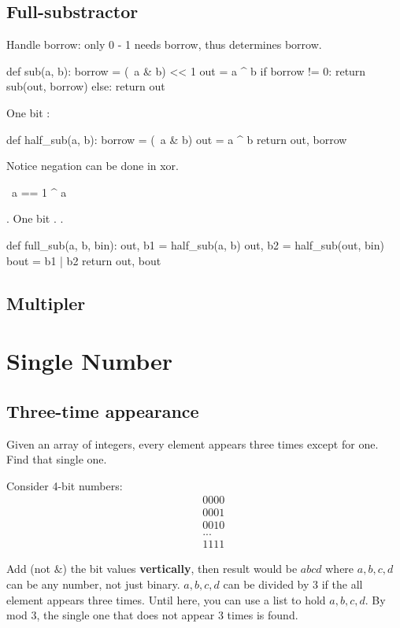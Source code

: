 \subsection{Full-substractor}
 Handle borrow: only 0 - 1 needs borrow, thus  determines borrow. 
\begin{python}
def sub(a, b):
  borrow = (~a & b) << 1
  out = a ^ b 
  if borrow != 0:
    return sub(out, borrow)
  else:
    return out
\end{python}
 One bit :
\begin{python}
def half_sub(a, b):
  borrow = (~a & b)
  out = a ^ b
  return out, borrow
\end{python}
Notice negation can be done in xor. 
\begin{python}
~a == 1 ^ a 
\end{python}
. One bit . . 
\begin{python}
def full_sub(a, b, bin):
  out, b1 = half_sub(a, b)
  out, b2 = half_sub(out, bin)
  bout = b1 | b2 
  return out, bout 
\end{python}

\subsection{Multipler}


\section{Single Number}
\subsection{Three-time appearance} 
Given an array of integers, every element appears three times except for one. Find that single one.

 Consider 4-bit numbers:
\begin{eqnarray*}
&& 0000 \\
&& 0001 \\
&& 0010 \\
&& ... \\
&& 1111
\end{eqnarray*}

Add (not $\&$) the bit values \textbf{vertically}, then result would be $abcd$ where $a, b, c, d$ can be any number, not just binary. $a, b, c, d$ can be divided by 3 if the all element appears three times. Until here, you can use a list to hold $a, b, c, d$. By mod 3, the single one that does not appear 3 times is found. 

